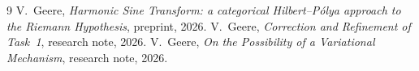 \documentclass[11pt,a4paper]{article}
\begin{document}
\begin{thebibliography}{9}
 V.\ Geere, \emph{Harmonic Sine Transform: a categorical Hilbert--Pólya approach to the Riemann Hypothesis}, preprint, 2026.
 V.\ Geere, \emph{Correction and Refinement of Task~1}, research note, 2026.
 V.\ Geere, \emph{On the Possibility of a Variational Mechanism}, research note, 2026.
\end{thebibliography}
\end{document}
